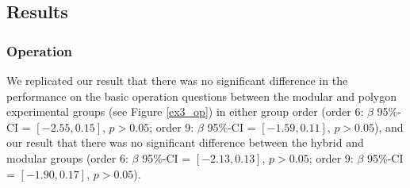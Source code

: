 \documentclass[11pt]{article}
\begin{document}
\subsection{Results} %
\subsubsection{Operation}
We replicated our result that there was no significant difference in the performance on the basic operation questions between the modular and polygon experimental groups (see Figure \ref{ex3_op}) in either group order (order 6: $\beta$ 95\%-CI = $[-2.55,0.15]$, $p > 0.05$; order 9: $\beta$ 95\%-CI = $[-1.59,0.11]$, $p > 0.05$), and our result that there was no significant difference between the hybrid and modular groups (order 6:  $\beta$ 95\%-CI = $[-2.13,0.13]$, $p > 0.05$; order 9: $\beta$ 95\%-CI = $[-1.90,0.17]$, $p > 0.05$).
\end{document}
